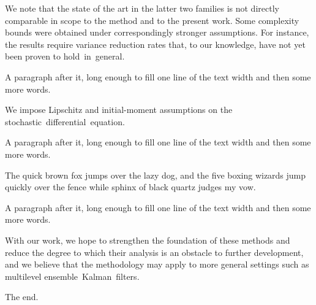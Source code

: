 \documentclass{article}
\begin{document}
We note that the state of the art in the latter two families is not directly comparable in scope to the method and to the present work. Some complexity bounds were obtained under correspondingly stronger assumptions. For instance, the results require variance reduction rates that, to our knowledge, have not yet been proven to hold~in~\mbox{general}.\hspace{-1cm}

A paragraph after it, long enough to fill one line of the text width and then some more words.

We impose Lipschitz and initial-moment assumptions on the stochastic~differential~\mbox{equation}.\hspace{-3cm}

A paragraph after it, long enough to fill one line of the text width and then some more words.

The quick brown fox jumps over the lazy dog, and the five boxing wizards jump quickly over the fence while sphinx of black quartz judges my vow.\hspace{-2cm}

A paragraph after it, long enough to fill one line of the text width and then some more words.

With our work, we hope to strengthen the foundation of these methods and reduce the degree to which their analysis is an obstacle to further development, and we believe that the methodology may apply to more general settings such as multilevel ensemble~Kalman~\mbox{filters}.\hspace{-1cm}

The end.
\end{document}
